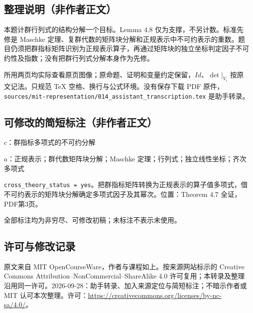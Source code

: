 \documentclass[UTF8,11pt]{ctexart}
\theoremstyle{definition}
\begin{document}
\subsection*{整理说明（非作者正文）}
本题计群行列式的结构分解一个目标。Lemma 4.8 仅为支撑，不另计数。标准先修是 Maschke 定理、复群代数的矩阵块分解和正规表示中不可约表示的重数。题目仍须把群指标矩阵识别为正规表示算子，再通过矩阵块的独立坐标判定因子不可约性及指数；没有把群行列式分解本身作为先修。

所用两页均实际查看原页图像；原命题、证明和变量约定保留，\(Id\)、\(\det|_{V_i}\) 按原文记法。只规范 TeX 空格、换行与公式环境。没有保存下载 PDF 原件，\texttt{sources/mit-representation/014\_assistant\_transcription.tex} 是助手转录。
\subsection*{可修改的简短标注（非作者正文）}
$c$：群指标多项式的不可约分解

$a$：正规表示；群代数矩阵块分解；Maschke 定理；行列式；独立线性坐标；齐次多项式

\texttt{cross\_theory\_status = yes}。把群指标矩阵转换为正规表示的算子值多项式，借不可约表示的矩阵块分解确定多项式因子及其幂次。位置：Theorem 4.7 全证，PDF第3页。

全部标注均为非穷尽、可修改初稿；未标注不表示未使用。
\subsection*{许可与修改记录}
原文来自 MIT OpenCourseWare，作者与课程如上。按来源网站标示的 Creative Commons Attribution--NonCommercial--ShareAlike 4.0 许可复用；本转录及整理沿用同一许可。2026-09-28：助手转录、加入来源定位与简短标注；不暗示作者或 MIT 认可本次整理。许可：\url{https://creativecommons.org/licenses/by-nc-sa/4.0/}。
\end{document}
